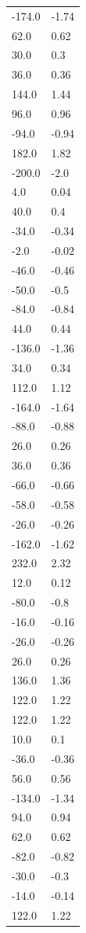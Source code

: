 \begin{longtable}{ll}
-174.0 & -1.74 \\
62.0 & 0.62 \\
30.0 & 0.3 \\
36.0 & 0.36 \\
144.0 & 1.44 \\
96.0 & 0.96 \\
-94.0 & -0.94 \\
182.0 & 1.82 \\
-200.0 & -2.0 \\
4.0 & 0.04 \\
40.0 & 0.4 \\
-34.0 & -0.34 \\
-2.0 & -0.02 \\
-46.0 & -0.46 \\
-50.0 & -0.5 \\
-84.0 & -0.84 \\
44.0 & 0.44 \\
-136.0 & -1.36 \\
34.0 & 0.34 \\
112.0 & 1.12 \\
-164.0 & -1.64 \\
-88.0 & -0.88 \\
26.0 & 0.26 \\
36.0 & 0.36 \\
-66.0 & -0.66 \\
-58.0 & -0.58 \\
-26.0 & -0.26 \\
-162.0 & -1.62 \\
232.0 & 2.32 \\
12.0 & 0.12 \\
-80.0 & -0.8 \\
-16.0 & -0.16 \\
-26.0 & -0.26 \\
26.0 & 0.26 \\
136.0 & 1.36 \\
122.0 & 1.22 \\
122.0 & 1.22 \\
10.0 & 0.1 \\
-36.0 & -0.36 \\
56.0 & 0.56 \\
-134.0 & -1.34 \\
94.0 & 0.94 \\
62.0 & 0.62 \\
-82.0 & -0.82 \\
-30.0 & -0.3 \\
-14.0 & -0.14 \\
122.0 & 1.22 \\

\end{longtable}
